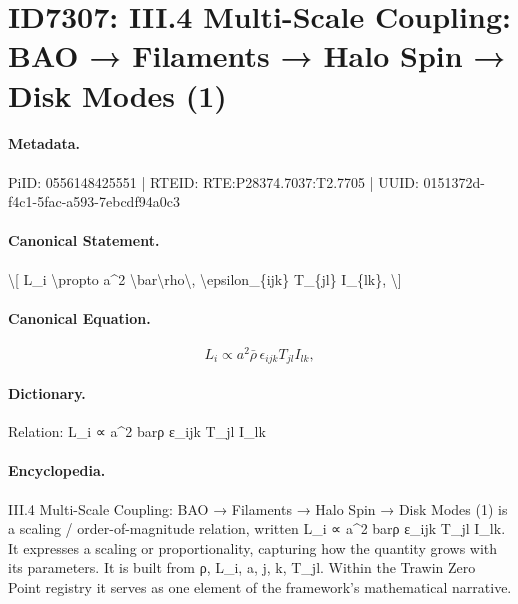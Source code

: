 \section*{ID7307: III.4 Multi-Scale Coupling: BAO → Filaments → Halo Spin → Disk Modes (1)}
\paragraph{Metadata.}
PiID: 0556148425551 | RTEID: RTE:P28374.7037:T2.7705 | UUID: 0151372d-f4c1-5fac-a593-7ebcdf94a0c3

\paragraph{Canonical Statement.}
\textbackslash{}[ L\_i \textbackslash{}propto a\textasciicircum{}2 \textbackslash{}bar\textbackslash{}rho\textbackslash{}, \textbackslash{}epsilon\_\{ijk\} T\_\{jl\} I\_\{lk\}, \textbackslash{}]

\paragraph{Canonical Equation.}
\[
L_i \propto a^2 \bar\rho\, \epsilon_{ijk} T_{jl} I_{lk},
\]

\paragraph{Dictionary.}
Relation: L\_i ∝ a\textasciicircum{}2 barρ ε\_ijk T\_jl I\_lk

\paragraph{Encyclopedia.}
III.4 Multi-Scale Coupling: BAO → Filaments → Halo Spin → Disk Modes (1) is a scaling / order-of-magnitude relation, written L\_i ∝ a\textasciicircum{}2 barρ ε\_ijk T\_jl I\_lk. It expresses a scaling or proportionality, capturing how the quantity grows with its parameters. It is built from ρ, L\_i, a, j, k, T\_jl. Within the Trawin Zero Point registry it serves as one element of the framework's mathematical narrative.

